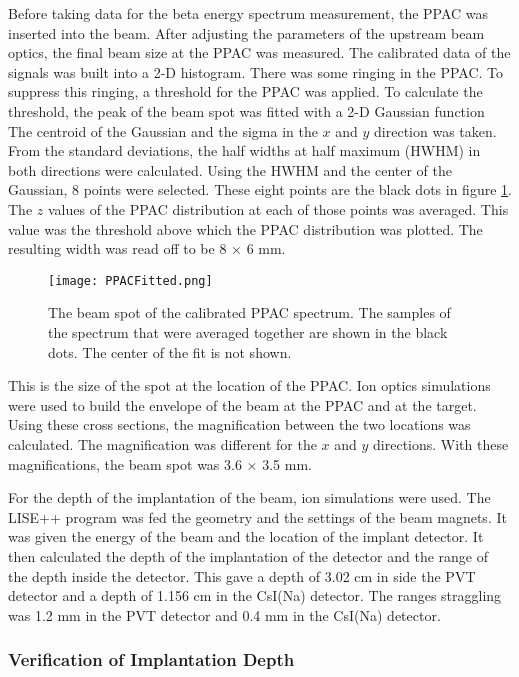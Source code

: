 \documentclass[../MaxHughesThesis.tex]{subfiles}
\begin{document}
Before taking data for the beta energy spectrum measurement, the PPAC was inserted into the beam.
After adjusting the parameters of the upstream beam optics, the final beam size at the PPAC was measured.
The calibrated data of the signals was built into a 2-D histogram.
There was some ringing in the PPAC.
To suppress this ringing, a threshold for the PPAC was applied. 
To calculate the threshold, the peak of the beam spot was fitted with a 2-D Gaussian function
The centroid of the Gaussian and the sigma in the $x$ and $y$ direction was taken. 
From the standard deviations, the half widths at half maximum (HWHM) in both directions were calculated. 
Using the HWHM and the center of the Gaussian, 8 points were selected.
These eight points are the black dots in figure \ref{fig:PPACSpotch}.
The $z$ values of the PPAC distribution at each of those points was averaged.
This value was the threshold above which the PPAC distribution was plotted.  
The resulting width was read off to be 8 $\times$ 6 mm.

\begin{figure}
	\centerline{\texttt{[image: PPACFitted.png]}}
	\caption{The beam spot of the calibrated PPAC spectrum. 
		 The samples of the spectrum that were averaged together are shown in the black dots.
		 The center of the fit is not shown.}
	\label{fig:PPACSpotch}
\end{figure}  

This is the size of the spot at the location of the PPAC. 
Ion optics simulations were used to build the envelope of the beam at the PPAC and at the target.
Using these cross sections, the magnification between the two locations was calculated.
The magnification was different for the $x$ and $y$ directions.
With these magnifications, the beam spot was 3.6 $\times$ 3.5 mm.  

For the depth of the implantation of the beam, ion simulations were used. 
The LISE++ program was fed the geometry and the settings of the beam magnets. 
It was given the energy of the beam and the location of the implant detector. 
It then calculated the depth of the implantation of the detector and the range of the depth inside the detector. 
This gave a depth of 3.02 cm in side the PVT detector and a depth of 1.156 cm in the CsI(Na) detector. 
The ranges straggling was 1.2 mm in the PVT detector and 0.4 mm in the CsI(Na) detector.

\subsubsection{Verification of Implantation Depth}
\end{document}
